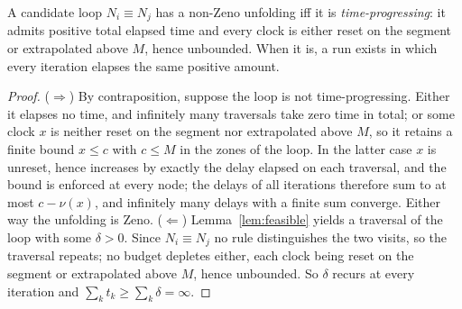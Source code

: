 \begin{lemma}\label{lem:nonzeno}
A candidate loop $N_i\equiv N_j$ has a non-Zeno unfolding iff it is \emph{time-progressing}: it admits
positive total elapsed time and every clock is either reset on the segment or extrapolated above $M$,
hence unbounded. When it is, a run exists in which every iteration elapses the same positive amount.
\end{lemma}
\begin{proof}
($\Rightarrow$) By contraposition, suppose the loop is not time-progressing. Either it elapses no
time, and infinitely many traversals take zero time in total; or some clock $x$ is neither reset on
the segment nor extrapolated above $M$, so it retains a finite bound $x\le c$ with $c\le M$ in the
zones of the loop. In the latter case $x$ is unreset, hence increases by exactly the delay elapsed on
each traversal, and the bound is enforced at every node; the delays of all iterations therefore sum to
at most $c-\nu(x)$, and infinitely many delays with a finite sum converge. Either way the unfolding is
Zeno.
($\Leftarrow$) Lemma~\ref{lem:feasible} yields a traversal of the loop with some $\delta>0$. Since
$N_i\equiv N_j$ no rule distinguishes the two visits, so the traversal repeats; no budget depletes
either, each clock being reset on the segment or extrapolated above $M$, hence unbounded. So $\delta$
recurs at every iteration and $\sum_k t_k\ge\sum_k\delta=\infty$.
\end{proof}

